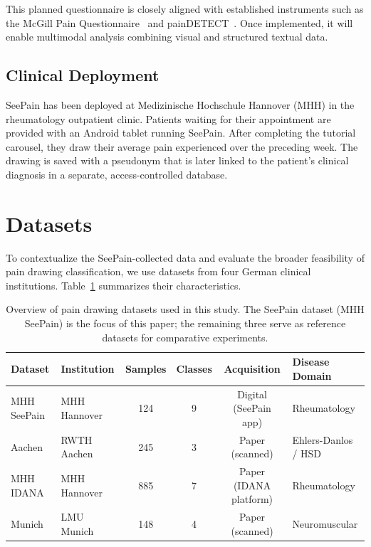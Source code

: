 \documentclass[conference]{IEEEtran}
\begin{document}
This planned questionnaire is closely aligned with established instruments such as the McGill Pain Questionnaire~\cite{melzack1975} and painDETECT~\cite{freynhagen2006}. Once implemented, it will enable multimodal analysis combining visual and structured textual data.

\subsection{Clinical Deployment}

SeePain has been deployed at Medizinische Hochschule Hannover (MHH) in the rheumatology outpatient clinic. Patients waiting for their appointment are provided with an Android tablet running SeePain. After completing the tutorial carousel, they draw their average pain experienced over the preceding week. The drawing is saved with a pseudonym that is later linked to the patient's clinical diagnosis in a separate, access-controlled database.

\section{Datasets}
\label{sec:datasets}

To contextualize the SeePain-collected data and evaluate the broader feasibility of pain drawing classification, we use datasets from four German clinical institutions. Table~\ref{tab:datasets} summarizes their characteristics.

\begin{table}[t]
\centering
\caption{Overview of pain drawing datasets used in this study. The SeePain dataset (MHH SeePain) is the focus of this paper; the remaining three serve as reference datasets for comparative experiments.}
\label{tab:datasets}
\begin{tabular}{@{}llcccl@{}}
\toprule
\textbf{Dataset} & \textbf{Institution} & \textbf{Samples} & \textbf{Classes} & \textbf{Acquisition} & \textbf{Disease Domain} \\
\midrule
MHH SeePain & MHH Hannover & 124 & 9 & Digital (SeePain app) & Rheumatology \\
Aachen & RWTH Aachen & 245 & 3 & Paper (scanned) & Ehlers-Danlos / HSD \\
MHH IDANA & MHH Hannover & 885 & 7 & Paper (IDANA platform) & Rheumatology \\
Munich & LMU Munich & 148 & 4 & Paper (scanned) & Neuromuscular \\
\bottomrule
\end{tabular}
\end{table}
\end{document}
